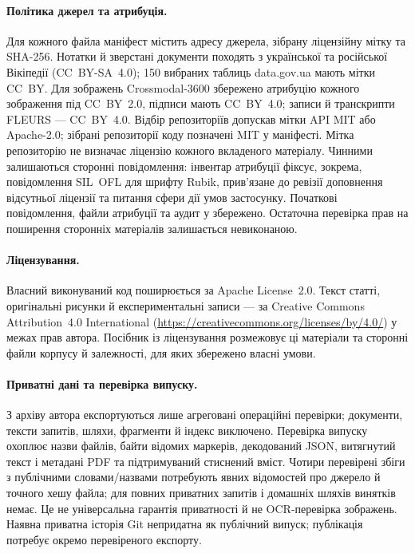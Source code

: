 \paragraph{Політика джерел та атрибуція.}
Для кожного файла маніфест містить адресу джерела, зібрану ліцензійну мітку та SHA-256. Нотатки й зверстані документи походять з української та російської Вікіпедії (CC~BY-SA~4.0); 150 вибраних таблиць data.gov.ua мають мітки CC~BY. Для зображень Crossmodal-3600 збережено атрибуцію кожного зображення під CC~BY~2.0, підписи мають CC~BY~4.0; записи й транскрипти FLEURS --- CC~BY~4.0. Відбір репозиторіїв допускав мітки API MIT або Apache-2.0; зібрані репозиторії коду позначені MIT у маніфесті. Мітка репозиторію не визначає ліцензію кожного вкладеного матеріалу. Чинними залишаються сторонні повідомлення: інвентар атрибуції фіксує, зокрема, повідомлення SIL~OFL для шрифту Rubik, прив'язане до ревізії доповнення відсутньої ліцензії та питання сфери дії умов застосунку. Початкові повідомлення, файли атрибуції та аудит у  збережено. Остаточна перевірка прав на поширення сторонніх матеріалів залишається невиконаною.

\paragraph{Ліцензування.}
Власний виконуваний код поширюється за Apache License~2.0. Текст статті, оригінальні рисунки й експериментальні записи --- за Creative Commons Attribution~4.0 International (\url{https://creativecommons.org/licenses/by/4.0/}) у межах прав автора. Посібник із ліцензування розмежовує ці матеріали та сторонні файли корпусу й залежності, для яких збережено власні умови.

\paragraph{Приватні дані та перевірка випуску.}
З архіву автора експортуються лише агреговані операційні перевірки; документи, тексти запитів, шляхи, фрагменти й індекс виключено. Перевірка випуску охоплює назви файлів, байти відомих маркерів, декодований JSON, витягнутий текст і метадані PDF та підтримуваний стиснений вміст. Чотири перевірені збіги з публічними словами/назвами потребують явних відомостей про джерело й точного хешу файла; для повних приватних запитів і домашніх шляхів винятків немає. Це не універсальна гарантія приватності й не OCR-перевірка зображень. Наявна приватна історія Git непридатна як публічний випуск; публікація потребує окремо перевіреного експорту.

